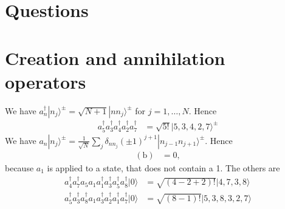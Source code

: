 \documentclass[english, parskip=full]{scrartcl}
\title{\titel}
\author{\autor}
\date{\today}
\newcommand{\tecxt}{}
\newcommand{\Ket}{}
\begin{document}
\maketitle  %

\section{Questions}
\section{Creation and annihilation operators}
We have $a_n^\dagger\Ket | {n_j} \rangle^\pm=\sqrt{N+1}\Ket | {n n_j} \rangle^\pm$ for $j=1,\dots,N$.
Hence
\begin{align*}
a_5^\dagger a_3^\dagger a_4^\dagger a_2^\dagger a_7^\dagger &=\sqrt{5!}\Ket | {5,3,4,2,7} \rangle^\pm
\end{align*}
We have $a_n\Ket | {n_j} \rangle^\pm=\frac{1}{\sqrt{N}}\sum_j\delta_{nn_j}(\pm 1)^{j+1}\Ket | {n_{j-1}n_{j+1}} \rangle^\pm$.
Hence
\begin{align*}
(\tecxt\text{b}) &= 0,
\end{align*}
because $a_1$ is applied to a state, that does not contain a 1.
The others are
\begin{align*}
a_4^\dagger a_7^\dagger a_5 a_1 a_1^\dagger a_3^\dagger a_5^\dagger a_8^\dagger\Ket | {0} \rangle &= \sqrt{(4-2+2)!}\Ket | {4,7,3,8} \rangle\\
a_5^\dagger a_3^\dagger a_8^\dagger a_1 a_3^\dagger a_2^\dagger a_1^\dagger a_7^\dagger\Ket | {0} \rangle &=\sqrt{(8-1)!}\Ket | {5,3,8,3,2,7} \rangle
\end{align*}
\end{document}

